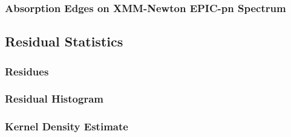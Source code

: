    		\subsubsection*{Absorption Edges on XMM-Newton EPIC-pn Spectrum}
    			
    			
    			
    			
    			
    	
    	\subsection{Residual Statistics}
    	
    		\subsubsection*{Residues}
	    		
	    		
	    		
	    		
	    		
	    		
    		
    		\subsubsection*{Residual Histogram}
    			
    			
    			
    		\subsubsection*{Kernel Density Estimate}
    			
    			
    		
